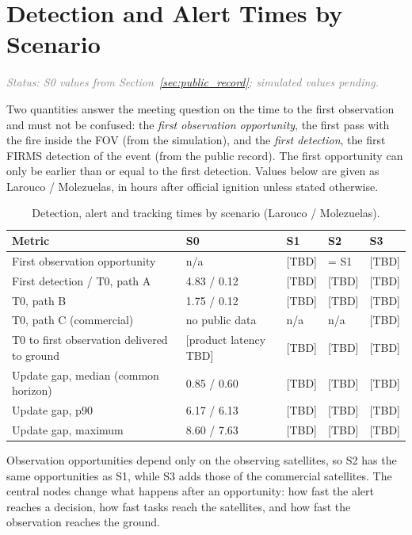 \documentclass[11pt]{article}
\newcommand{\status}[1]{\textit{\textcolor{gray}{Status: #1}}}
\begin{document}
\section{Detection and Alert Times by Scenario}\label{sec:results_scenarios}

\status{S0 values from Section~\ref{sec:public_record}; simulated values pending.}

Two quantities answer the meeting question on the time to the first observation and must not be confused: the \emph{first observation opportunity}, the first pass with the fire inside the FOV (from the simulation), and the \emph{first detection}, the first FIRMS detection of the event (from the public record). The first opportunity can only be earlier than or equal to the first detection. Values below are given as Larouco / Molezuelas, in hours after official ignition unless stated otherwise.

\begin{longtable}{p{4.6cm}p{2.6cm}p{2.0cm}p{2.0cm}p{2.0cm}}
\caption{Detection, alert and tracking times by scenario (Larouco / Molezuelas).}\label{tab:results_scenarios}\\
\toprule
\textbf{Metric} & \textbf{S0} & \textbf{S1} & \textbf{S2} & \textbf{S3} \\
\midrule
\endhead
First observation opportunity & n/a & [TBD] & = S1 & [TBD] \\
First detection / T0, path A & 4.83 / 0.12 & [TBD] & [TBD] & [TBD] \\
T0, path B & 1.75 / 0.12 & [TBD] & [TBD] & [TBD] \\
T0, path C (commercial) & no public data & n/a & n/a & [TBD] \\
T0 to first observation delivered to ground & [product latency TBD] & [TBD] & [TBD] & [TBD] \\
Update gap, median (common horizon) & 0.85 / 0.60 & [TBD] & [TBD] & [TBD] \\
Update gap, p90 & 6.17 / 6.13 & [TBD] & [TBD] & [TBD] \\
Update gap, maximum & 8.60 / 7.63 & [TBD] & [TBD] & [TBD] \\
\bottomrule
\end{longtable}

Observation opportunities depend only on the observing satellites, so S2 has the same opportunities as S1, while S3 adds those of the commercial satellites. The central nodes change what happens after an opportunity: how fast the alert reaches a decision, how fast tasks reach the satellites, and how fast the observation reaches the ground.
\end{document}
